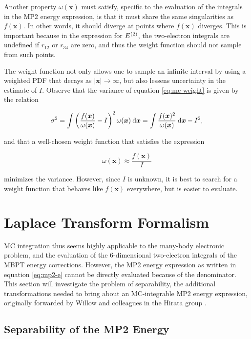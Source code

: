 Another property $\omega(\bm x)$ must satisfy, specific to the evaluation of the
integrals in the MP2 energy expression, is that it must share the same
singularities as $f(\bm x)$. In other words, it should diverge at points where
$f(\bm x)$ diverges. This is important because in the expression for
$\perturbE[]{2}$, the two-electron integrals are undefined if $r_{12}$ or
$r_{34}$ are zero, and thus the weight function should not sample from such
points.

The weight function not only allows one to sample an infinite interval by using
a weighted PDF that decays as $|\bm x| \rightarrow \infty$, but also lessens
uncertainty in the estimate of $I$. Observe that the variance of
equation \ref{eq:mc-weight} is given by the relation

\begin{equation}
	\sigma^2 = \int \left( \frac{f(\bm x)}{\omega(\bm x)} - I \right)^2 \omega(\bm x) \dif \bm x
	= \int \frac{f(\bm x)^2}{\omega(\bm x)} \dif\bm x - I^2,
\end{equation}

\noindent and that a well-chosen weight function that satisfies the expression

\begin{equation}
	\omega(\bm x) \approx \frac{f(\bm x)}{I}
\end{equation}

\noindent minimizes the variance. However, since $I$ is unknown, it is best to
search for a weight function that behaves like $f(\bm x)$ everywhere, but is
easier to evaluate.

\section{Laplace Transform Formalism}
\label{s:laplace}

MC integration thus seems highly applicable to the many-body electronic problem,
and the evaluation of the 6-dimensional two-electron integrals of the MBPT
energy corrections. However, the MP2 energy expression as written in equation
\ref{eq:mp2-e} cannot be directly evaluated because of the denominator. This
section will investigate the problem of separability, the additional
transformations needed to bring about an MC-integrable MP2 energy expression,
originally forwarded by Willow and colleagues in the Hirata group \cite{willow1,
willow2}.

\subsection{Separability of the MP2 Energy}

